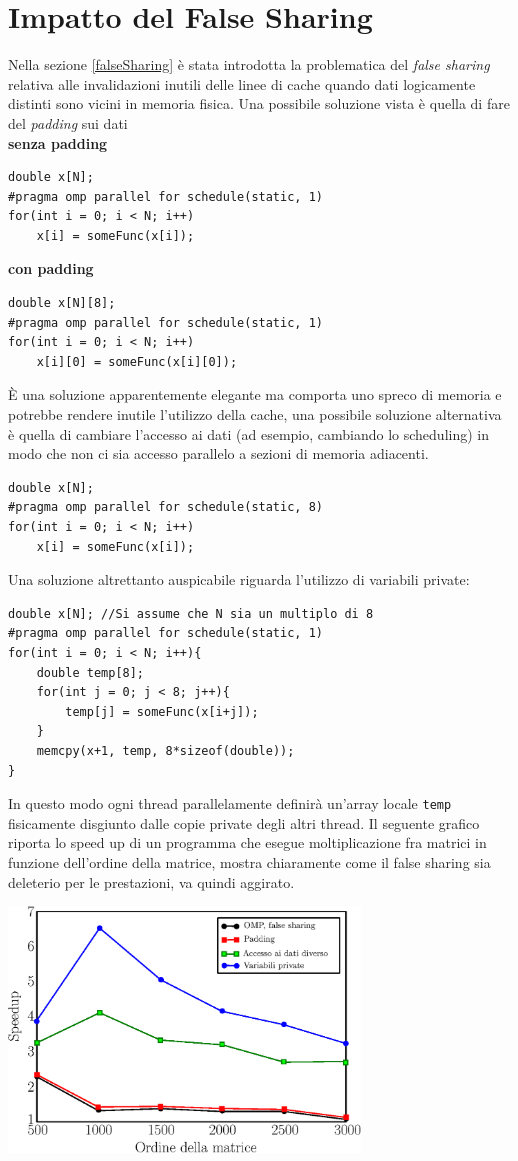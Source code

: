 \documentclass[10pt, letterpaper]{report}
\begin{document}
\section{Impatto del False Sharing}
Nella sezione \ref{falseSharing} è stata introdotta la problematica del \textit{false sharing} relativa alle invalidazioni inutili delle linee di cache quando dati logicamente distinti sono vicini in memoria fisica. Una possibile soluzione vista è quella di fare del \textit{padding} sui dati\\ 
\textbf{senza padding}
\begin{lstlisting}[style=CStyle]
double x[N];
#pragma omp parallel for schedule(static, 1)
for(int i = 0; i < N; i++)
    x[i] = someFunc(x[i]);
\end{lstlisting}
\textbf{con padding}
\begin{lstlisting}[style=CStyle]
double x[N][8];
#pragma omp parallel for schedule(static, 1)
for(int i = 0; i < N; i++)
    x[i][0] = someFunc(x[i][0]);
\end{lstlisting}
È una soluzione apparentemente elegante ma comporta uno spreco di memoria e potrebbe rendere inutile l'utilizzo della cache, una possibile soluzione alternativa è quella di cambiare l'accesso ai dati (ad esempio, cambiando lo scheduling) in modo che non ci sia accesso parallelo a sezioni di memoria adiacenti.
\begin{lstlisting}[style=CStyle]
double x[N];
#pragma omp parallel for schedule(static, 8)
for(int i = 0; i < N; i++)
    x[i] = someFunc(x[i]);
\end{lstlisting}
Una soluzione altrettanto auspicabile riguarda l'utilizzo di variabili private:
\begin{lstlisting}[style=CStyle]
double x[N]; //Si assume che N sia un multiplo di 8
#pragma omp parallel for schedule(static, 1)
for(int i = 0; i < N; i++){
    double temp[8];
    for(int j = 0; j < 8; j++){
        temp[j] = someFunc(x[i+j]);
    }
    memcpy(x+1, temp, 8*sizeof(double));
}
\end{lstlisting}
In questo modo ogni thread parallelamente definirà un'array locale \texttt{temp} fisicamente disgiunto dalle copie private degli altri thread.\acc 
Il seguente grafico riporta lo speed up di un programma che esegue moltiplicazione fra matrici in funzione dell'ordine della matrice, mostra chiaramente come il false sharing sia deleterio per le prestazioni, va quindi aggirato.
\begin{center}
    \includegraphics[width=0.7\textwidth ]{images/falseSharing.eps}
\end{center}
\end{document}
